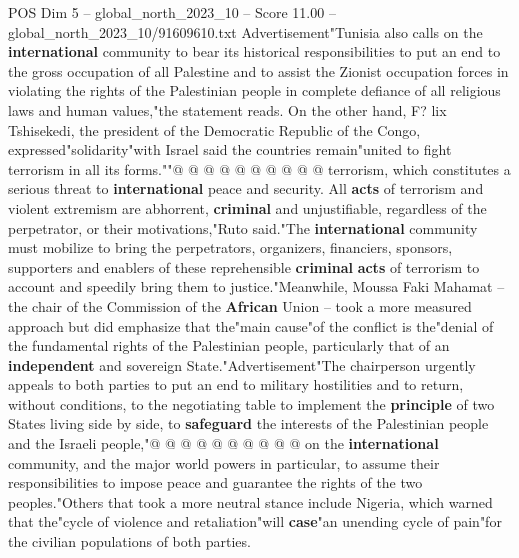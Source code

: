 \begin{textsample}{POS Dim 5 – global\_north\_2023\_10 – Score 11.00 – global\_north\_2023\_10/91609610.txt}
Advertisement"Tunisia also calls on the \textbf{international} community to bear its historical responsibilities to put an end to the gross occupation of all Palestine and to assist the Zionist occupation forces in violating the rights of the Palestinian people in complete defiance of all religious laws and human values,"the statement reads.
On the other hand, F? lix Tshisekedi, the president of the Democratic Republic of the Congo, expressed"solidarity"with Israel said the countries remain"united to fight terrorism in all its forms.""@ @ @ @ @ @ @ @ @ @ terrorism, which constitutes a serious threat to \textbf{international} peace and security.
All \textbf{acts} of terrorism and violent extremism are abhorrent, \textbf{criminal} and unjustifiable, regardless of the perpetrator, or their motivations,"Ruto said."The \textbf{international} community must mobilize to bring the perpetrators, organizers, financiers, sponsors, supporters and enablers of these reprehensible \textbf{criminal} \textbf{acts} of terrorism to account and speedily bring them to justice."Meanwhile, Moussa Faki Mahamat -- the chair of the Commission of the \textbf{African} Union -- took a more measured approach but did emphasize that the"main cause"of the conflict is the"denial of the fundamental rights of the Palestinian people, particularly that of an \textbf{independent} and sovereign State."Advertisement"The chairperson urgently appeals to both parties to put an end to military hostilities and to return, without conditions, to the negotiating table to implement the \textbf{principle} of two States living side by side, to \textbf{safeguard} the interests of the Palestinian people and the Israeli people,"@ @ @ @ @ @ @ @ @ @ on the \textbf{international} community, and the major world powers in particular, to assume their responsibilities to impose peace and guarantee the rights of the two peoples."Others that took a more neutral stance include Nigeria, which warned that the"cycle of violence and retaliation"will \textbf{case}"an unending cycle of pain"for the civilian populations of both parties.

\end{textsample}
